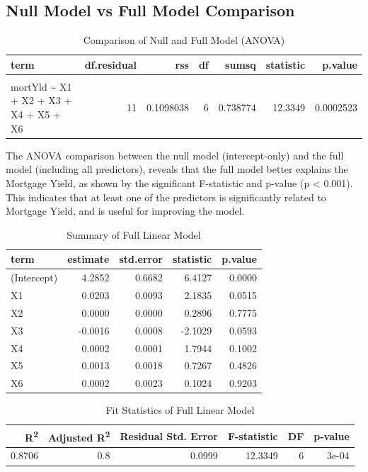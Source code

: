 \documentclass[
  11pt,
]{article}
\begin{document}
\subsection{Null Model vs Full Model
Comparison}\label{null-model-vs-full-model-comparison}

\begingroup\fontsize{8}{10}\selectfont

\begin{longtable}[t]{lrrrrrr}
\caption{\label{tab:unnamed-chunk-9}Comparison of Null and Full Model (ANOVA)}\\
\toprule
term & df.residual & rss & df & sumsq & statistic & p.value\\
\midrule
\cellcolor{gray!10}{mortYld \textasciitilde{} 1} & \cellcolor{gray!10}{17} & \cellcolor{gray!10}{0.8485778} & \cellcolor{gray!10}{NA} & \cellcolor{gray!10}{NA} & \cellcolor{gray!10}{NA} & \cellcolor{gray!10}{NA}\\
mortYld \textasciitilde{} X1 + X2 + X3 + X4 + X5 + X6 & 11 & 0.1098038 & 6 & 0.738774 & 12.3349 & 0.0002523\\
\bottomrule
\end{longtable}
\endgroup{}

The ANOVA comparison between the null model (intercept-only) and the
full model (including all predictors), reveals that the full model
better explains the Mortgage Yield, as shown by the significant
F-statistic and p-value (p \textless{} 0.001). This indicates that at
least one of the predictors is significantly related to Mortgage Yield,
and is useful for improving the model.

\begin{table}[!h]
\centering
\caption{\label{tab:unnamed-chunk-10}Summary of Full Linear Model}
\centering
\fontsize{8}{10}\selectfont
\begin{tabular}[t]{lrrrr}
\toprule
term & estimate & std.error & statistic & p.value\\
\midrule
(Intercept) & 4.2852 & 0.6682 & 6.4127 & 0.0000\\
X1 & 0.0203 & 0.0093 & 2.1835 & 0.0515\\
X2 & 0.0000 & 0.0000 & 0.2896 & 0.7775\\
X3 & -0.0016 & 0.0008 & -2.1029 & 0.0593\\
X4 & 0.0002 & 0.0001 & 1.7944 & 0.1002\\
\addlinespace
X5 & 0.0013 & 0.0018 & 0.7267 & 0.4826\\
X6 & 0.0002 & 0.0023 & 0.1024 & 0.9203\\
\bottomrule
\end{tabular}
\end{table}
\begin{table}[!h]
\centering
\caption{\label{tab:unnamed-chunk-11}Fit Statistics of Full Linear Model}
\centering
\fontsize{8}{10}\selectfont
\begin{tabular}[t]{rrrrrr}
\toprule
R\textsuperscript{2} & Adjusted R\textsuperscript{2} & Residual Std. Error & F-statistic & DF & p-value\\
\midrule
0.8706 & 0.8 & 0.0999 & 12.3349 & 6 & 3e-04\\
\bottomrule
\end{tabular}
\end{table}
\end{document}
